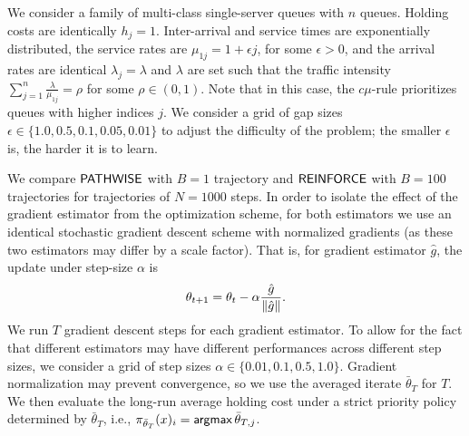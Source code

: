 We consider a family of multi-class single-server queues with $n$ queues. Holding costs are identically $h_{j} = 1$. Inter-arrival and service times are exponentially distributed, the service rates are $\mu_{1j} = 1 + \epsilon j$, for some $\epsilon>0$, and the arrival rates are identical $\lambda_{j} = \lambda$ and $\lambda$ are set such that the traffic intensity $\sum_{j=1}^{n} \frac{\lambda}{\mu_{1j}} = \rho$
for some $\rho \in (0,1)$. Note that in this case, the $c\mu$-rule prioritizes queues with higher indices $j$. We consider a grid of gap sizes $\epsilon \in \{1.0, 0.5, 0.1, 0.05, 0.01 \}$ to adjust the difficulty of the problem; the smaller $\epsilon$ is, the harder it is to learn.

We compare $\mathsf{PATHWISE}$ with $B=1$ trajectory and $\mathsf{REINFORCE}$ with $B = 100$ trajectories for trajectories of $N = 1000$ steps. In order to isolate the effect of the gradient estimator from the optimization scheme, for both estimators we use an identical stochastic gradient descent scheme with normalized gradients (as these two estimators may differ by a scale factor). That is, for gradient estimator $\hat{g}$, the update under step-size $\alpha$ is
\[
\theta_{t+1} = \theta_{t} - \alpha \frac{\hat{g}}{\left\|{\hat{g}}\right\|}.
\]
We run $T$ gradient descent steps for each gradient estimator. To allow for the fact that different estimators may have different performances across different step sizes, we consider a grid of step sizes $\alpha \in \{0.01, 0.1, 0.5, 1.0 \}$. Gradient normalization may prevent convergence, so we use the averaged iterate $\bar{\theta}_{T}$ for $T$. We then evaluate the long-run average holding cost under a strict priority policy determined by $\bar{\theta}_{T}$, i.e., $\pi_{\bar{\theta}_{T}}(x)_{i} = \mathop{\mathsf{argmax}} \bar{\theta}_{T,j}$. 



    

